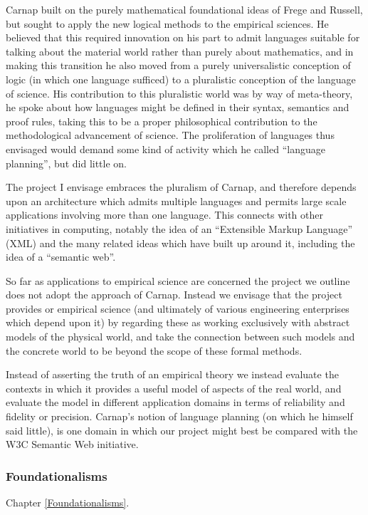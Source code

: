 Carnap built on the purely mathematical foundational ideas of Frege
and Russell, but sought to apply the new logical methods to the
empirical sciences.
He believed that this required innovation on his part to admit
languages suitable for talking about the material world rather than
purely about mathematics, and in making this transition he also moved
from a purely universalistic conception of logic (in which one language
sufficed) to a pluralistic conception of the language of science.
His contribution to this pluralistic world was by way of meta-theory,
he spoke about how languages might be defined in their syntax,
semantics and proof rules, taking this to be a proper philosophical
contribution to the methodological advancement of science.
The proliferation of languages thus envisaged would demand some kind
of activity which he called ``language planning'', but did little on.

The project I envisage embraces the pluralism of Carnap, and therefore
depends upon an architecture which admits multiple languages and
permits large scale applications involving more than one language.
This connects with other initiatives in computing, notably the idea of
an ``Extensible Markup Language'' (XML) and the many related ideas
which have built up around it, including the idea of a ``semantic web''.

So far as applications to empirical science are concerned the project
we outline does not adopt the approach of Carnap.
Instead we envisage that the project provides or empirical science
(and ultimately of various engineering enterprises which depend upon it)
by regarding these as working exclusively with abstract models of the
physical world, and take the connection between such models and the
concrete world to be beyond the scope of these formal methods.

Instead of asserting the truth of an empirical theory we instead
evaluate the contexts in which it provides a useful model of aspects
of the real world, and evaluate the model in different application
domains in terms of reliability and fidelity or precision.
Carnap's notion of language planning (on which he himself said
little), is one domain in which our project might best be compared
with the W3C Semantic Web initiative.

\subsubsection{Foundationalisms}

Chapter \ref{Foundationalisms}.

